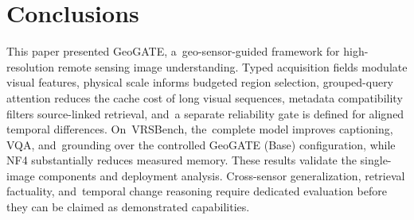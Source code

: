 \documentclass[applsci,article,accept,moreauthors]{Definitions/mdpi}
\begin{document}
\section{Conclusions}

This paper presented GeoGATE, a~geo-sensor-guided framework for high-resolution remote sensing image understanding. Typed acquisition fields modulate visual features, physical scale informs budgeted region selection, grouped-query attention reduces the cache cost of long visual sequences, metadata compatibility filters source-linked retrieval, and~a separate reliability gate is defined for aligned temporal differences. On~VRSBench, the~complete model improves captioning, VQA, and~grounding over the controlled GeoGATE (Base) configuration, while NF4 substantially reduces measured memory. These results validate the single-image components and deployment analysis. Cross-sensor generalization, retrieval factuality, and~temporal change reasoning require dedicated evaluation before they can be claimed as demonstrated capabilities.
\vspace{+6pt}

\end{document}
